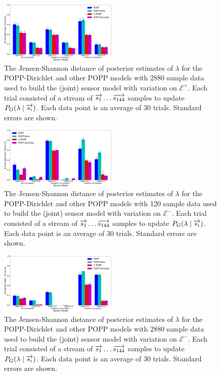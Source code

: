 \begin{figure}[t!]
	\centering
	\includegraphics[width=0.5\textwidth]{./figures/tjpr_comparison_2880_kl.png}
	\caption{The Jensen-Shannon distance of posterior estimates of $\lambda$ for the POPP-Dirichlet and other POPP models with 2880 sample data used to build the (joint) sensor model with variation on $\mathcal{E^+}$. Each trial consisted of a stream of $\protect\overrightarrow{s_1} \ldots \protect\overrightarrow{s_{144}}$ samples to update $P_G(\lambda \mid \protect\overrightarrow{s_i})$. Each data point is an average of 30 trials. Standard errors are shown.} 
	\label{fig:tpjr_comparison_2880_kl}
\end{figure}

\begin{figure}[t!]
	\centering
	\includegraphics[width=0.5\textwidth]{./figures/tjnr_comparison_120_kl.png}
	\caption{The Jensen-Shannon distance of posterior estimates of $\lambda$ for the POPP-Dirichlet and other POPP models with 120 sample data used to build the (joint) sensor model with variation on $\mathcal{E^-}$. Each trial consisted of a stream of $\protect\overrightarrow{s_1} \ldots \protect\overrightarrow{s_{144}}$ samples to update $P_G(\lambda \mid \protect\overrightarrow{s_i})$. Each data point is an average of 30 trials. Standard errors are shown.} 
	\label{fig:tjnr_comparison_120_kl}
\end{figure}

\begin{figure}[t!]
	\centering
	\includegraphics[width=0.5\textwidth]{./figures/tjnr_comparison_2880_kl.png}
	\caption{The Jensen-Shannon distance of posterior estimates of $\lambda$ for the POPP-Dirichlet and other POPP models with 2880 sample data used to build the (joint) sensor model with variation on $\mathcal{E^-}$. Each trial consisted of a stream of $\protect\overrightarrow{s_1} \ldots \protect\overrightarrow{s_{144}}$ samples to update $P_G(\lambda \mid \protect\overrightarrow{s_i})$. Each data point is an average of 30 trials. Standard errors are shown.} 
	\label{fig:tjnr_comparison_2880_kl}
\end{figure}
